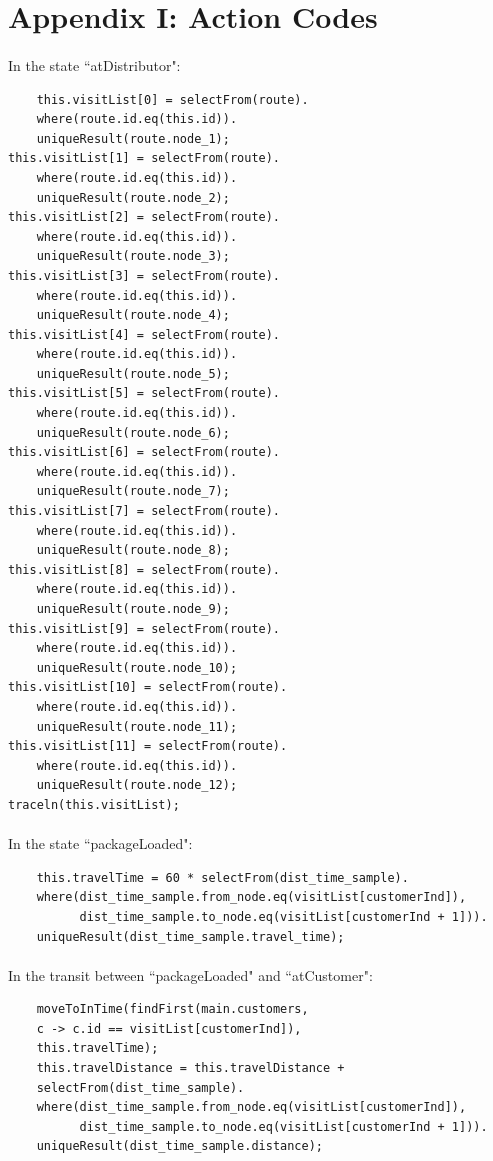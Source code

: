 \documentclass[12pt]{article}
\numberwithin{equation}{section}
\begin{document}
\newpage

\printbibliography

\newpage
\appendix

\section*{Appendix I: Action Codes}

\paragraph{}In the state ``atDistributor":
	\begin{verbatim}
	this.visitList[0] = selectFrom(route).
	where(route.id.eq(this.id)).
	uniqueResult(route.node_1);
this.visitList[1] = selectFrom(route).
	where(route.id.eq(this.id)).
	uniqueResult(route.node_2);
this.visitList[2] = selectFrom(route).
	where(route.id.eq(this.id)).
	uniqueResult(route.node_3);
this.visitList[3] = selectFrom(route).
	where(route.id.eq(this.id)).
	uniqueResult(route.node_4);
this.visitList[4] = selectFrom(route).
	where(route.id.eq(this.id)).
	uniqueResult(route.node_5);
this.visitList[5] = selectFrom(route).
	where(route.id.eq(this.id)).
	uniqueResult(route.node_6);
this.visitList[6] = selectFrom(route).
	where(route.id.eq(this.id)).
	uniqueResult(route.node_7);
this.visitList[7] = selectFrom(route).
	where(route.id.eq(this.id)).
	uniqueResult(route.node_8);
this.visitList[8] = selectFrom(route).
	where(route.id.eq(this.id)).
	uniqueResult(route.node_9);
this.visitList[9] = selectFrom(route).
	where(route.id.eq(this.id)).
	uniqueResult(route.node_10);
this.visitList[10] = selectFrom(route).
	where(route.id.eq(this.id)).
	uniqueResult(route.node_11);
this.visitList[11] = selectFrom(route).
	where(route.id.eq(this.id)).
	uniqueResult(route.node_12);
traceln(this.visitList);
	\end{verbatim}
	
	\paragraph{}In the state ``packageLoaded":
	\begin{verbatim}
	this.travelTime = 60 * selectFrom(dist_time_sample).
	where(dist_time_sample.from_node.eq(visitList[customerInd]),
		  dist_time_sample.to_node.eq(visitList[customerInd + 1])).
	uniqueResult(dist_time_sample.travel_time);
	\end{verbatim}
	
	\paragraph{}In the transit between ``packageLoaded" and ``atCustomer":
	\begin{verbatim}
	moveToInTime(findFirst(main.customers,
	c -> c.id == visitList[customerInd]),
	this.travelTime);
	this.travelDistance = this.travelDistance + 
	selectFrom(dist_time_sample).
	where(dist_time_sample.from_node.eq(visitList[customerInd]),
		  dist_time_sample.to_node.eq(visitList[customerInd + 1])).
	uniqueResult(dist_time_sample.distance);
	\end{verbatim}
	



	
\end{document}
